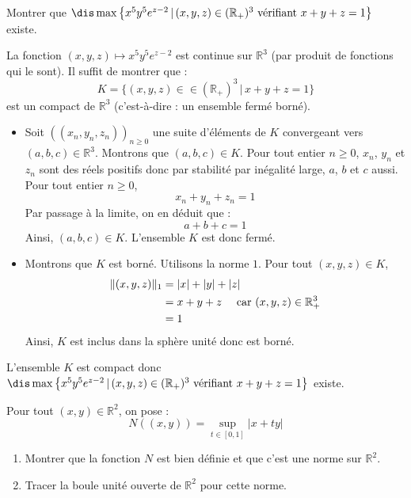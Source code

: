 \documentclass[a4paper,10pt]{report}
\begin{document}
\begin{Exa} Montrer que $\dis \max \left\lbrace x^5y^5 e^{z-2} \, \vert \, (x,y,z) \in (\mathbb{R}_+)^3 \hbox{ vérifiant } x+y+z =1 \right\rbrace$ existe.
\end{Exa}

\corr La fonction $(x,y,z) \mapsto x^5y^5 e^{z-2}$ est continue sur $\mathbb{R}^3$ (par produit de fonctions qui le sont). Il suffit de montrer que :
$$K= \lbrace (x,y,z) \in \in (\mathbb{R}_+)^3 \, \vert \, x+y+z=1 \rbrace$$
est un compact de $\mathbb{R}^3$ (c'est-à-dire : un ensemble fermé borné).

\begin{itemize}
\item Soit $((x_n,y_n,z_n))_{n \geq 0}$ une suite d'éléments de $K$ convergeant vers $(a,b,c) \in \mathbb{R}^3$. Montrons que $(a,b,c) \in K$. Pour tout entier $n \geq 0$, $x_n$, $y_n$ et $z_n$ sont des réels positifs donc par stabilité par inégalité large, $a$, $b$ et $c$ aussi. Pour tout entier $n \geq 0$,
$$ x_n + y_n + z_n = 1$$
Par passage à la limite, on en déduit que :
$$ a+b+c=1$$
Ainsi, $(a,b,c) \in K$. L'ensemble $K$ est donc fermé.
\item Montrons que $K$ est borné. Utilisons la norme $1$. Pour tout $(x,y,z) \in K$,
\begin{align*}
\Vert (x,y,z) \Vert_1 & = \vert x \vert + \vert y \vert + \vert z \vert \\
& = x+y+z \quad \hbox{ car } (x,y,z) \in \mathbb{R}_+^{3} \\
& = 1
\end{align*}
Ainsi, $K$ est inclus dans la sphère unité donc est borné.
\end{itemize}
L'ensemble $K$ est compact donc $\dis \max \left\lbrace x^5y^5 e^{z-2} \, \vert \, (x,y,z) \in (\mathbb{R}_+)^3 \hbox{ vérifiant } x+y+z =1 \right\rbrace$ existe.


\begin{Exa} Pour tout $(x,y) \in \mathbb{R}^2$, on pose :
$$ N((x,y)) = \sup_{t \in [0,1]} \vert x+ty \vert$$

\begin{enumerate}
\item Montrer que la fonction $N$ est bien définie et que c'est une norme sur $\mathbb{R}^2$.
\item Tracer la boule unité ouverte de $\mathbb{R}^2$ pour cette norme.
\end{enumerate}
\end{Exa}

\corr 
\end{document}
